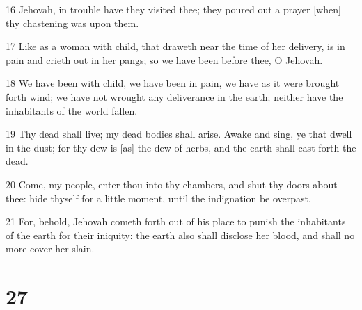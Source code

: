 \par 16 Jehovah, in trouble have they visited thee; they poured out a prayer [when] thy chastening was upon them.
\par 17 Like as a woman with child, that draweth near the time of her delivery, is in pain and crieth out in her pangs; so we have been before thee, O Jehovah.
\par 18 We have been with child, we have been in pain, we have as it were brought forth wind; we have not wrought any deliverance in the earth; neither have the inhabitants of the world fallen.
\par 19 Thy dead shall live; my dead bodies shall arise. Awake and sing, ye that dwell in the dust; for thy dew is [as] the dew of herbs, and the earth shall cast forth the dead.
\par 20 Come, my people, enter thou into thy chambers, and shut thy doors about thee: hide thyself for a little moment, until the indignation be overpast.
\par 21 For, behold, Jehovah cometh forth out of his place to punish the inhabitants of the earth for their iniquity: the earth also shall disclose her blood, and shall no more cover her slain.

\chapter{27}


